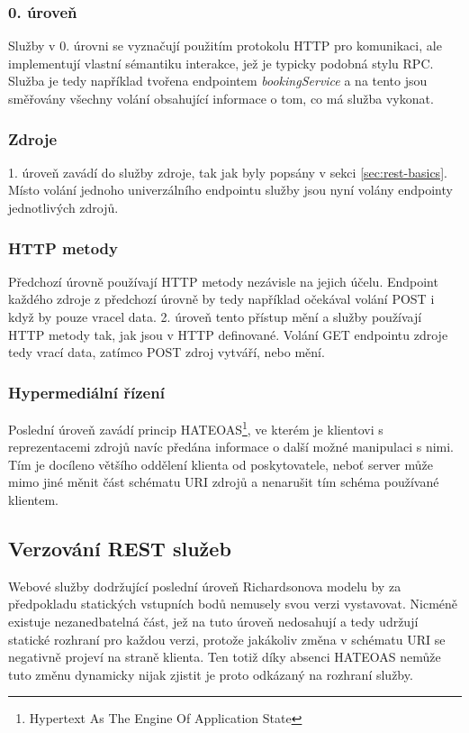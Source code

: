 \documentclass[czech,DP]{thesiskiv}
\begin{document}
\subsubsection{0. úroveň}
Služby v 0. úrovni se vyznačují použitím protokolu HTTP pro komunikaci, ale implementují vlastní sémantiku interakce, jež je typicky podobná stylu RPC. Služba je tedy například tvořena endpointem \textit{bookingService} a na tento jsou směřovány všechny volání obsahující informace o tom, co má služba vykonat. 

\subsubsection{Zdroje}
1. úroveň zavádí do služby zdroje, tak jak byly popsány v sekci \ref{sec:rest-basics}. Místo volání jednoho univerzálního endpointu služby jsou nyní volány endpointy jednotlivých zdrojů.

\subsubsection{HTTP metody}
Předchozí úrovně používají HTTP metody nezávisle na jejich účelu. Endpoint každého zdroje z předchozí úrovně by tedy například očekával volání POST i když by pouze vracel data. 2. úroveň tento přístup mění a služby používají HTTP metody tak, jak jsou v HTTP definované. Volání GET endpointu zdroje tedy vrací data, zatímco POST zdroj vytváří, nebo mění. 

\subsubsection{Hypermediální řízení}
Poslední úroveň zavádí princip HATEOAS\footnote{Hypertext As The Engine Of Application State}, ve kterém je klientovi s reprezentacemi zdrojů navíc předána informace o další možné manipulaci s nimi. Tím je docíleno většího oddělení klienta od poskytovatele, neboť server může mimo jiné měnit část schématu URI zdrojů a nenarušit tím schéma používané klientem.

\subsection{Verzování REST služeb}

Webové služby dodržující poslední úroveň Richardsonova modelu by za předpokladu statických vstupních bodů nemusely svou verzi vystavovat. Nicméně existuje nezanedbatelná část, jež na tuto úroveň nedosahují a tedy udržují statické rozhraní pro každou verzi, protože jakákoliv změna v schématu URI se negativně projeví na straně klienta. Ten totiž díky absenci HATEOAS nemůže tuto změnu dynamicky nijak zjistit je proto odkázaný na rozhraní služby. 
\end{document}
